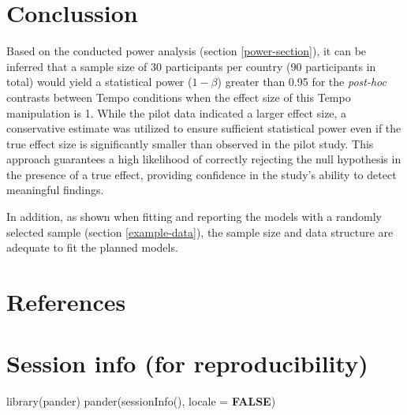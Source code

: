 \documentclass[
  bookmarksnumbered]{article}
\newenvironment{Shaded}{\begin{snugshade}}{\end{snugshade}}
\newcommand{\AttributeTok}[1]{\textcolor[rgb]{0.80,0.80,0.80}{#1}}
\newcommand{\ConstantTok}[1]{\textcolor[rgb]{0.86,0.64,0.64}{\textbf{#1}}}
\newcommand{\FunctionTok}[1]{\textcolor[rgb]{0.94,0.94,0.56}{#1}}
\newcommand{\NormalTok}[1]{\textcolor[rgb]{0.80,0.80,0.80}{#1}}
\begin{document}
\hypertarget{conclussion}{%
\section{Conclussion}\label{conclussion}}

Based on the conducted power analysis (section \ref{power-section}), it can be inferred that a sample size of 30 participants per country (90 participants in total) would yield a statistical power (\(1 - \beta\)) greater than 0.95 for the \emph{post-hoc} contrasts between Tempo conditions when the effect size of this Tempo manipulation is 1. While the pilot data indicated a larger effect size, a conservative estimate was utilized to ensure sufficient statistical power even if the true effect size is significantly smaller than observed in the pilot study. This approach guarantees a high likelihood of correctly rejecting the null hypothesis in the presence of a true effect, providing confidence in the study's ability to detect meaningful findings.

In addition, as shown when fitting and reporting the models with a randomly selected sample (section \ref{example-data}), the sample size and data structure are adequate to fit the planned models.

\hypertarget{refs}{%
\section*{References}\label{refs}}

\begin{multicols}{2}
\AtNextBibliography{\footnotesize}
\printbibliography[heading=none]
\normalsize
\end{multicols}

\def\printbibliography{}

\hypertarget{session}{%
\section*{Session info (for reproducibility)}\label{session}}

\begin{Shaded}
\begin{Highlighting}[]
\FunctionTok{library}\NormalTok{(pander)}
\FunctionTok{pander}\NormalTok{(}\FunctionTok{sessionInfo}\NormalTok{(), }\AttributeTok{locale =} \ConstantTok{FALSE}\NormalTok{)}
\end{Highlighting}
\end{Shaded}
\end{document}
